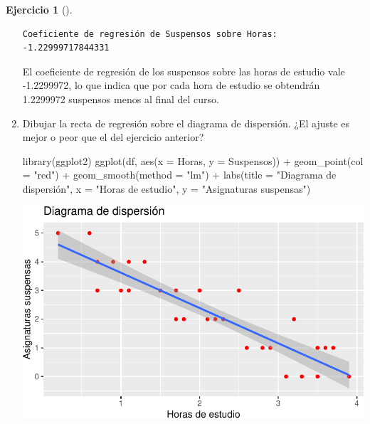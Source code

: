 \documentclass[
  a4paper,
]{scrreport}
\newenvironment{Shaded}{\begin{snugshade}}{\end{snugshade}}
\newcommand{\AttributeTok}[1]{\textcolor[rgb]{0.40,0.45,0.13}{#1}}
\newcommand{\FunctionTok}[1]{\textcolor[rgb]{0.28,0.35,0.67}{#1}}
\newcommand{\NormalTok}[1]{\textcolor[rgb]{0.00,0.23,0.31}{#1}}
\newcommand{\SpecialCharTok}[1]{\textcolor[rgb]{0.37,0.37,0.37}{#1}}
\newcommand{\StringTok}[1]{\textcolor[rgb]{0.13,0.47,0.30}{#1}}
\theoremstyle{definition}
\newtheorem{exercise}{Ejercicio}[chapter]
\theoremstyle{remark}
\begin{document}
\begin{exercise}[]
\begin{enumerate}
\begin{tcolorbox}
\begin{verbatim}
Coeficiente de regresión de Suspensos sobre Horas: -1.22999717844331
\end{verbatim}

  El coeficiente de regresión de los suspensos sobre las horas de
  estudio vale -1.2299972, lo que indica que por cada hora de estudio se
  obtendrán 1.2299972 suspensos menos al final del curso.

  \end{tcolorbox}
\item
  Dibujar la recta de regresión sobre el diagrama de dispersión. ¿El
  ajuste es mejor o peor que el del ejercicio anterior?

  \begin{tcolorbox}[enhanced jigsaw, toprule=.15mm, rightrule=.15mm, arc=.35mm, colback=white, colbacktitle=quarto-callout-tip-color!10!white, toptitle=1mm, left=2mm, colframe=quarto-callout-tip-color-frame, opacityback=0, breakable, opacitybacktitle=0.6, bottomtitle=1mm, titlerule=0mm, title=\textcolor{quarto-callout-tip-color}{\faLightbulb}\hspace{0.5em}{Solución}, bottomrule=.15mm, coltitle=black, leftrule=.75mm]

\begin{Shaded}
\begin{Highlighting}[]
\FunctionTok{library}\NormalTok{(ggplot2)}
\FunctionTok{ggplot}\NormalTok{(df, }\FunctionTok{aes}\NormalTok{(}\AttributeTok{x =}\NormalTok{ Horas, }\AttributeTok{y =}\NormalTok{ Suspensos)) }\SpecialCharTok{+}
    \FunctionTok{geom\_point}\NormalTok{(}\AttributeTok{col =} \StringTok{"red"}\NormalTok{) }\SpecialCharTok{+}
    \FunctionTok{geom\_smooth}\NormalTok{(}\AttributeTok{method =} \StringTok{"lm"}\NormalTok{) }\SpecialCharTok{+}
    \FunctionTok{labs}\NormalTok{(}\AttributeTok{title =} \StringTok{"Diagrama de dispersión"}\NormalTok{, }\AttributeTok{x =} \StringTok{"Horas de estudio"}\NormalTok{, }\AttributeTok{y =} \StringTok{"Asignaturas suspensas"}\NormalTok{)}
\end{Highlighting}
\end{Shaded}

  \includegraphics{05-regresion_files/figure-pdf/unnamed-chunk-14-1.pdf}


\end{tcolorbox}
\end{enumerate}
\end{exercise}
\end{document}
